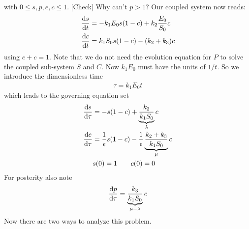 with $0 \leq s,p,e,c\leq 1$. {\color{red} [Check]} Why can't $p>1$? Our coupled system now reads:
\begin{align*}
	\frac{\mathrm{d} s}{\mathrm{d} t} &= -{k_1 E_0} s(1-c) + k_2 \frac{E_0}{S_0} c \\
	\frac{\mathrm{d} c}{\mathrm{d} t} &= k_1 S_0 s (1-c) - (k_2+k_3) c 
\end{align*}
using $e+c=1$. Note that we do not need the evolution equation for $P$ to solve the coupled sub-system $S$ and $C$. Now $k_1 E_0$ must have the units of $1/t$. So we introduce the dimensionless time 
\begin{gather*}
	\tau = k_1 E_0 t
\end{gather*}
which leads to the governing equation set
\begin{align*}
	\frac{\mathrm{d} s}{\mathrm{d} \tau} &= -s(1-c) + \underbrace{\frac{k_2}{k_1 S_0}}_\lambda c \\
	\frac{\mathrm{d} c}{\mathrm{d} \tau} &= \frac{1}{\epsilon} s (1-c) - \frac{1}{\epsilon} \underbrace{\frac{k_2+k_3}{k_1 S_0}}_\mu  c \\
	& s(0) = 1 \qquad c(0)=0
\end{align*}
For posterity also note
\begin{gather*}
	\frac{\mathrm{d} p}{\mathrm{d} \tau} = \underbrace{\frac{k_3}{k_1 S_0}}_{\mu -\lambda} c
\end{gather*}
Now there are two ways to analyze this problem. 
